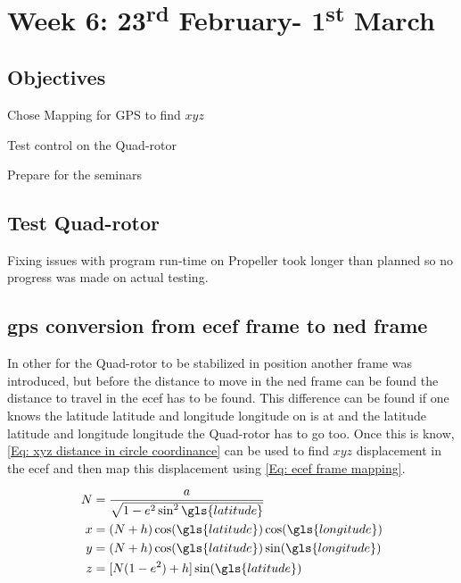 \chapter{Week 6: 23\textsuperscript{rd} February- 1\textsuperscript{st} March }
 \tocless\section{Objectives}
\begin{itemize*}
	\item Chose Mapping for GPS to find \ensuremath{xyz}
	\item Test control on the Quad-rotor
	\item  Prepare for the seminars 

\end{itemize*}


 \tocless\section{Test Quad-rotor}
Fixing issues with program run-time on Propeller took longer than planned so no progress was made on actual testing.

 \tocless\section{\gls{gps} conversion from \gls{ecef} frame to \gls{ned} frame }
In other for the Quad-rotor to be stabilized in position another frame was introduced, but before the distance to move in the \gls{ned} frame can be found the distance to travel in the \gls{ecef} has to be found. This difference can be found if one knows the latitude \gls{latitude} and longitude \gls{longitude} on is at and the latitude \gls{latitude} and longitude \gls{longitude} the Quad-rotor has to go too. Once this is know, \eqref{Eq: xyz distance in circle coordinance} can be used to find $xyz$ displacement in the \gls{ecef} and then map this displacement using \eqref{Eq: ecef frame mapping}.


\begin{align}
\begin{split}
N &= \frac{a}{\sqrt{1 - e^2\sin^2\gls{latitude}}}\\
x&= (N+h)\cos(\gls{latitude})\cos(\gls{longitude})\\
y &= (N+h)\cos(\gls{latitude})\sin(\gls{longitude})\\
z &= [N(1-e^2)+h]\sin(\gls{latitude})
\end{split}
\label{Eq: xyz distance in circle coordinance}
\end{align}

